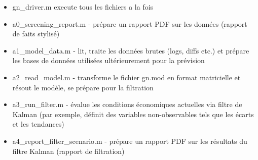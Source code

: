 \begin{itemize}
        \item {\color{magenta}gn\_driver.m} execute tous les fichiers a la fois
        \item {\color{magenta}a0\_screening\_report.m} - prépare un rapport PDF sur les données (rapport de faits stylisé)
        \item {\color{magenta}a1\_model\_data.m} - lit, traite les données brutes (logs, diffs etc.) et prépare les bases de données utilisées ultérieurement pour la prévision
        \item {\color{magenta}a2\_read\_model.m} - transforme le fichier gn.mod en format matricielle et résout le modèle, se prépare pour la filtration
        \item {\color{magenta}a3\_run\_filter.m} - évalue les conditions économiques actuelles via filtre de Kalman (par exemple, définit des variables non-observables tels que les écarts et les tendances)
        \item {\color{magenta}a4\_report\_filter\_scenario.m} - prépare un rapport PDF sur les résultats du filtre Kalman (rapport de filtration)
    \end{itemize}